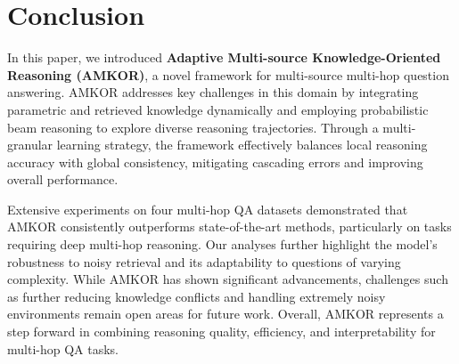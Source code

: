 \section{Conclusion}
In this paper, we introduced \textbf{Adaptive Multi-source Knowledge-Oriented Reasoning (AMKOR)}, a novel framework for multi-source multi-hop question answering. AMKOR addresses key challenges in this domain by integrating parametric and retrieved knowledge dynamically and employing probabilistic beam reasoning to explore diverse reasoning trajectories. Through a multi-granular learning strategy, the framework effectively balances local reasoning accuracy with global consistency, mitigating cascading errors and improving overall performance.

Extensive experiments on four multi-hop QA datasets demonstrated that AMKOR consistently outperforms state-of-the-art methods, particularly on tasks requiring deep multi-hop reasoning. Our analyses further highlight the model's robustness to noisy retrieval and its adaptability to questions of varying complexity. While AMKOR has shown significant advancements, challenges such as further reducing knowledge conflicts and handling extremely noisy environments remain open areas for future work. Overall, AMKOR represents a step forward in combining reasoning quality, efficiency, and interpretability for multi-hop QA tasks.